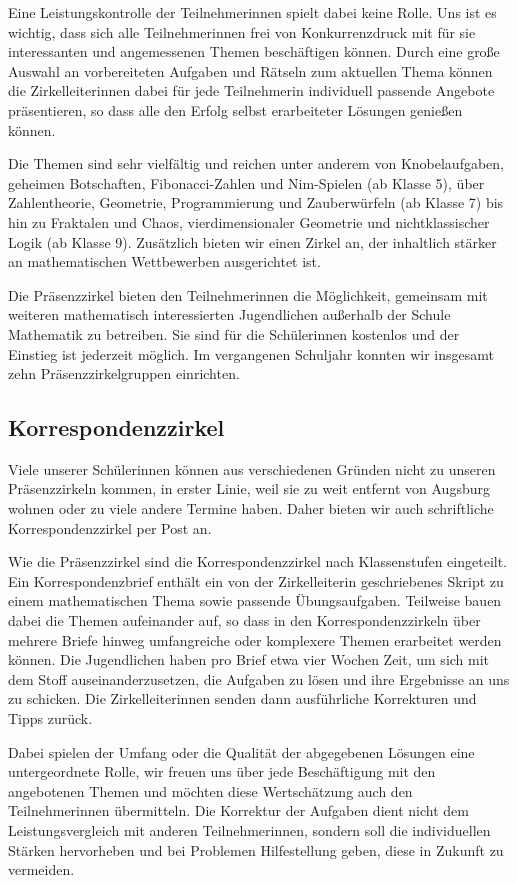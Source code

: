 \documentclass[12pt]{zettel}
\begin{document}
Eine Leistungskontrolle der Teilnehmerinnen spielt dabei keine Rolle. Uns ist es wichtig, dass sich alle Teilnehmerinnen frei von Konkurrenzdruck mit für sie interessanten
und angemessenen Themen beschäftigen können. Durch eine große Auswahl an vorbereiteten Aufgaben und Rätseln zum aktuellen Thema können die Zirkelleiterinnen dabei für
jede Teilnehmerin individuell passende Angebote präsentieren, so dass alle den Erfolg selbst erarbeiteter Lösungen genießen können.

Die Themen sind sehr vielfältig und reichen unter anderem von
Knobelaufgaben, geheimen Botschaften, Fibonacci-Zahlen und Nim-Spielen (ab Klasse 5),
über Zahlentheorie, Geometrie, Programmierung und Zauberwürfeln (ab Klasse 7) bis hin zu
Fraktalen und Chaos, vierdimensionaler Geometrie und nichtklassischer Logik
(ab Klasse 9). Zusätzlich bieten wir einen Zirkel an, der inhaltlich stärker an
mathematischen Wettbewerben ausgerichtet ist.

Die Präsenzzirkel bieten den Teilnehmerinnen die Möglichkeit,
gemeinsam mit weiteren mathematisch interessierten Jugendlichen außerhalb der
Schule Mathematik zu betreiben. Sie sind für die Schülerinnen kostenlos und der Einstieg ist jederzeit möglich. Im vergangenen Schuljahr konnten wir insgesamt zehn
Präsenzzirkelgruppen einrichten.

\subsection{Korrespondenzzirkel}

Viele unserer Schülerinnen können aus verschiedenen Gründen
nicht zu unseren Prä\-senz\-zir\-keln kommen, in erster Linie, weil sie zu weit
entfernt von Augsburg wohnen oder zu viele andere Termine haben.
Daher bieten wir auch schriftliche Korrespondenzzirkel per Post
an.

Wie die Präsenzzirkel sind die Korrespondenzzirkel nach Klassenstufen eingeteilt. Ein
Korrespondenzbrief enthält ein von der Zirkelleiterin geschriebenes Skript zu einem mathematischen Thema sowie passende
Übungsaufgaben. Teilweise bauen dabei die Themen aufeinander auf, so dass in den Korrespondenzzirkeln über mehrere Briefe hinweg umfangreiche oder komplexere Themen erarbeitet
werden können. Die Jugendlichen haben pro Brief etwa vier Wochen Zeit, um sich
mit dem Stoff auseinanderzusetzen, die Aufgaben zu lösen und ihre Ergebnisse
an uns zu schicken. Die Zirkelleiterinnen senden dann
ausführliche Korrekturen und Tipps zurück.

Dabei spielen der Umfang oder die Qualität der abgegebenen Lösungen eine untergeordnete Rolle, wir freuen uns über jede Beschäftigung
mit den angebotenen Themen und möchten diese Wertschätzung auch den Teilnehmerinnen übermitteln. Die Korrektur der Aufgaben dient nicht dem Leistungsvergleich mit anderen
Teilnehmerinnen, sondern soll die individuellen Stärken hervorheben und bei Problemen Hilfestellung geben, diese in Zukunft zu vermeiden.
\end{document}
